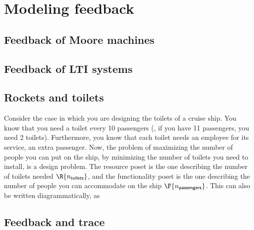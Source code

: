 
\section{Modeling feedback}
\label{sec:modeling-feedback}


\subsection{Feedback of Moore machines}


\subsection{Feedback of LTI systems}


\subsection{Rockets and toilets}

    Consider the case in which you are designing the toilets of a cruise ship.
    You know that you need a toilet every 10 passengers (\ie , if you have 11 passengers, you need 2 toilets).
    Furthermore, you know that each toilet needs an employee for its service, \ie an extra passenger.
    Now, the problem of maximizing the number of people you can put on the ship, by minimizing the number of toilets you need to install, is a design problem.
    The resource poset is the one describing the number of toilets needed $\R{n_\mathsf{toilets}}$, and the functionality poset is the one describing the number of people you can accommodate on the ship $\F{n_\mathsf{passengers}}$.
    This can also be written diagrammatically, as



\subsection{Feedback and trace}



